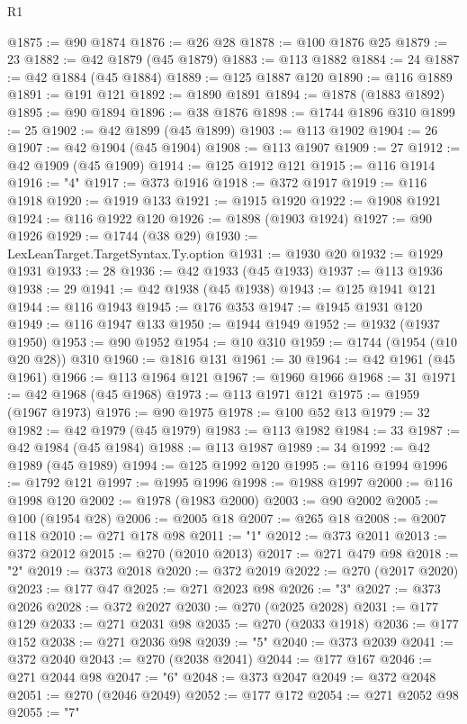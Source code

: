 \begin{lexlean}{R1}
\begin{coremodule}
@1875 := @90 @1874
@1876 := @26 @28
@1878 := @100 @1876 @25
@1879 := 23
@1882 := @42 @1879 (@45 @1879)
@1883 := @113 @1882
@1884 := 24
@1887 := @42 @1884 (@45 @1884)
@1889 := @125 @1887 @120
@1890 := @116 @1889
@1891 := @191 @121
@1892 := @1890 @1891
@1894 := @1878 (@1883 @1892)
@1895 := @90 @1894
@1896 := @38 @1876
@1898 := @1744 @1896 @310
@1899 := 25
@1902 := @42 @1899 (@45 @1899)
@1903 := @113 @1902
@1904 := 26
@1907 := @42 @1904 (@45 @1904)
@1908 := @113 @1907
@1909 := 27
@1912 := @42 @1909 (@45 @1909)
@1914 := @125 @1912 @121
@1915 := @116 @1914
@1916 := "4"
@1917 := @373 @1916
@1918 := @372 @1917
@1919 := @116 @1918
@1920 := @1919 @133
@1921 := @1915 @1920
@1922 := @1908 @1921
@1924 := @116 @1922 @120
@1926 := @1898 (@1903 @1924)
@1927 := @90 @1926
@1929 := @1744 (@38 @29)
@1930 := LexLeanTarget.TargetSyntax.Ty.option
@1931 := @1930 @20
@1932 := @1929 @1931
@1933 := 28
@1936 := @42 @1933 (@45 @1933)
@1937 := @113 @1936
@1938 := 29
@1941 := @42 @1938 (@45 @1938)
@1943 := @125 @1941 @121
@1944 := @116 @1943
@1945 := @176 @353
@1947 := @1945 @1931 @120
@1949 := @116 @1947 @133
@1950 := @1944 @1949
@1952 := @1932 (@1937 @1950)
@1953 := @90 @1952
@1954 := @10 @310
@1959 := @1744 (@1954 (@10 @20 @28)) @310
@1960 := @1816 @131
@1961 := 30
@1964 := @42 @1961 (@45 @1961)
@1966 := @113 @1964 @121
@1967 := @1960 @1966
@1968 := 31
@1971 := @42 @1968 (@45 @1968)
@1973 := @113 @1971 @121
@1975 := @1959 (@1967 @1973)
@1976 := @90 @1975
@1978 := @100 @52 @13
@1979 := 32
@1982 := @42 @1979 (@45 @1979)
@1983 := @113 @1982
@1984 := 33
@1987 := @42 @1984 (@45 @1984)
@1988 := @113 @1987
@1989 := 34
@1992 := @42 @1989 (@45 @1989)
@1994 := @125 @1992 @120
@1995 := @116 @1994
@1996 := @1792 @121
@1997 := @1995 @1996
@1998 := @1988 @1997
@2000 := @116 @1998 @120
@2002 := @1978 (@1983 @2000)
@2003 := @90 @2002
@2005 := @100 (@1954 @28)
@2006 := @2005 @18
@2007 := @265 @18
@2008 := @2007 @118
@2010 := @271 @178 @98
@2011 := "1"
@2012 := @373 @2011
@2013 := @372 @2012
@2015 := @270 (@2010 @2013)
@2017 := @271 @479 @98
@2018 := "2"
@2019 := @373 @2018
@2020 := @372 @2019
@2022 := @270 (@2017 @2020)
@2023 := @177 @47
@2025 := @271 @2023 @98
@2026 := "3"
@2027 := @373 @2026
@2028 := @372 @2027
@2030 := @270 (@2025 @2028)
@2031 := @177 @129
@2033 := @271 @2031 @98
@2035 := @270 (@2033 @1918)
@2036 := @177 @152
@2038 := @271 @2036 @98
@2039 := "5"
@2040 := @373 @2039
@2041 := @372 @2040
@2043 := @270 (@2038 @2041)
@2044 := @177 @167
@2046 := @271 @2044 @98
@2047 := "6"
@2048 := @373 @2047
@2049 := @372 @2048
@2051 := @270 (@2046 @2049)
@2052 := @177 @172
@2054 := @271 @2052 @98
@2055 := "7"

\end{coremodule}
\end{lexlean}
